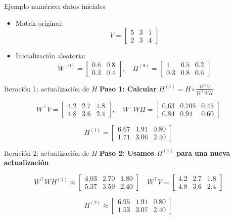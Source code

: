 \documentclass{beamer}
\begin{document}
\begin{frame}{Ejemplo numérico: datos iniciales}
\begin{itemize}
    \item Matriz original:
    \[
        V = \begin{bmatrix}
            5 & 3 & 1 \\
            2 & 3 & 4
        \end{bmatrix}
    \]
    \item Inicialización aleatoria:
    \[
        W^{(0)} = \begin{bmatrix}
            0.6 & 0.8 \\
            0.3 & 0.4
        \end{bmatrix}, \quad
        H^{(0)} = \begin{bmatrix}
            1 & 0.5 & 0.2 \\
            0.3 & 0.8 & 0.6
        \end{bmatrix}
    \]
\end{itemize}
\end{frame}

\begin{frame}{Iteración 1: actualización de \( H \)}
\textbf{Paso 1: Calcular} \( H^{(1)} = H \circ \frac{W^\top V}{W^\top WH} \)

\[
W^\top V =
\begin{bmatrix}
4.2 & 2.7 & 1.8 \\
4.8 & 3.6 & 2.4
\end{bmatrix}, \quad
W^\top W H =
\begin{bmatrix}
0.63 & 0.705 & 0.45 \\
0.84 & 0.94 & 0.60
\end{bmatrix}
\]

\[
H^{(1)} =
\begin{bmatrix}
6.67 & 1.91 & 0.80 \\
1.71 & 3.06 & 2.40
\end{bmatrix}
\]
\end{frame}

\begin{frame}{Iteración 2: actualización de \( H \)}
\textbf{Paso 2: Usamos \( H^{(1)} \) para una nueva actualización}

\[
W^\top W H^{(1)} \approx
\begin{bmatrix}
4.03 & 2.70 & 1.80 \\
5.37 & 3.59 & 2.40
\end{bmatrix}
\quad
W^\top V =
\begin{bmatrix}
4.2 & 2.7 & 1.8 \\
4.8 & 3.6 & 2.4
\end{bmatrix}
\]

\[
H^{(2)} \approx
\begin{bmatrix}
6.95 & 1.91 & 0.80 \\
1.53 & 3.07 & 2.40
\end{bmatrix}
\]
\end{frame}
\end{document}
